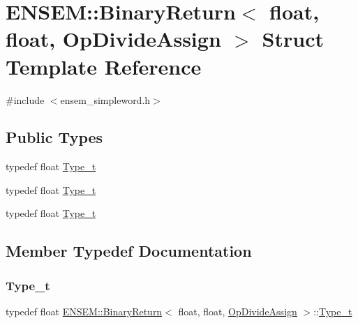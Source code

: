 \hypertarget{structENSEM_1_1BinaryReturn_3_01float_00_01float_00_01OpDivideAssign_01_4}{}\section{E\+N\+S\+EM\+:\+:Binary\+Return$<$ float, float, Op\+Divide\+Assign $>$ Struct Template Reference}
\label{structENSEM_1_1BinaryReturn_3_01float_00_01float_00_01OpDivideAssign_01_4}


{\ttfamily \#include $<$ensem\+\_\+simpleword.\+h$>$}

\subsection*{Public Types}
\begin{DoxyCompactItemize}
\item 
typedef float \mbox{\hyperlink{structENSEM_1_1BinaryReturn_3_01float_00_01float_00_01OpDivideAssign_01_4_a9343566dc5cdc2470343502c7d2affe5}{Type\+\_\+t}}
\item 
typedef float \mbox{\hyperlink{structENSEM_1_1BinaryReturn_3_01float_00_01float_00_01OpDivideAssign_01_4_a9343566dc5cdc2470343502c7d2affe5}{Type\+\_\+t}}
\item 
typedef float \mbox{\hyperlink{structENSEM_1_1BinaryReturn_3_01float_00_01float_00_01OpDivideAssign_01_4_a9343566dc5cdc2470343502c7d2affe5}{Type\+\_\+t}}
\end{DoxyCompactItemize}


\subsection{Member Typedef Documentation}
\mbox{\label{structENSEM_1_1BinaryReturn_3_01float_00_01float_00_01OpDivideAssign_01_4_a9343566dc5cdc2470343502c7d2affe5}} 
\subsubsection{\texorpdfstring{Type\_t}{Type\_t}\hspace{0.1cm}{\footnotesize\ttfamily [1/3]}}
{\footnotesize\ttfamily typedef float \mbox{\hyperlink{structENSEM_1_1BinaryReturn}{E\+N\+S\+E\+M\+::\+Binary\+Return}}$<$ float, float, \mbox{\hyperlink{structENSEM_1_1OpDivideAssign}{Op\+Divide\+Assign}} $>$\+::\mbox{\hyperlink{structENSEM_1_1BinaryReturn_3_01float_00_01float_00_01OpDivideAssign_01_4_a9343566dc5cdc2470343502c7d2affe5}{Type\+\_\+t}}}

